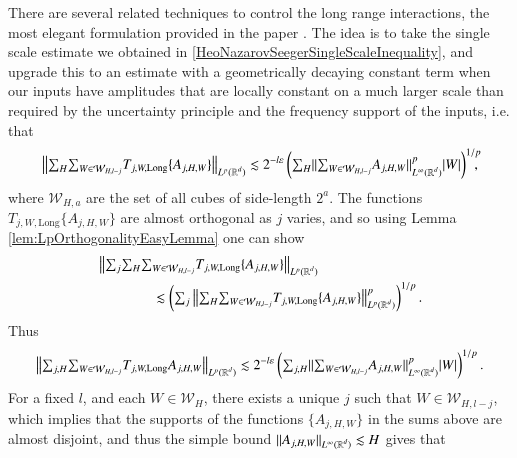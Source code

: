 There are several related techniques to control the long range interactions, the most elegant formulation provided in the paper \cite{HeoandNazarovandSeeger2}. The idea is to take the single scale estimate we obtained in \ref{HeoNazarovSeegerSingleScaleInequality}, and upgrade this to an estimate with a geometrically decaying constant term when our inputs have amplitudes that are locally constant on a much larger scale than required by the uncertainty principle and the frequency support of the inputs, i.e. that
%
\begin{equation}
  \left\| {\textstyle \sum\nolimits_H} {\textstyle \sum\nolimits_{W \in \mathcal{W}_{H,l-j}}} T_{j,W,\text{Long}} \{ A_{j,H,W} \} \right\|_{L^p(\operatorname{\mathbb{R}}^d)} \lesssim 2^{-l \varepsilon} \left( {\textstyle \sum\nolimits_H} \| {\textstyle \sum\nolimits_{W \in \mathcal{W}_{H,l-j}}} A_{j,H,W} \|_{L^\infty(\operatorname{\mathbb{R}}^d)}^p |W| \right)^{1/p}\!\!\!\!,
\end{equation}
%
where $\mathcal{W}_{H,a}$ are the set of all cubes of side-length $2^a$. The functions $T_{j,W,\text{Long}} \{ A_{j,H,W} \}$ are almost orthogonal as $j$ varies, and so using Lemma \ref{lem:LpOrthogonalityEasyLemma} one can show
\begin{equation}
\begin{split}
  &\left\| {\textstyle \sum\nolimits_j} {\textstyle \sum\nolimits_H} {\textstyle \sum\nolimits_{W \in \mathcal{W}_{H,l-j}}} T_{j,W,\text{Long}} \{ A_{j,H,W} \} \right\|_{L^p(\operatorname{\mathbb{R}}^d)}\\
  &\quad\quad\quad\quad \lesssim \left( {\textstyle \sum\nolimits_j} \left\| {\textstyle \sum\nolimits_H} {\textstyle \sum\nolimits_{W \in \mathcal{W}_{H,l-j}}} T_{j,W,\text{Long}} \{ A_{j,H,W} \} \right\|_{L^p(\operatorname{\mathbb{R}}^d)}^p \right)^{1/p}.
\end{split}
\end{equation}
%
Thus
%
\begin{equation}
  \left\| {\textstyle \sum\nolimits_{j,H}} {\textstyle \sum\nolimits_{W \in \mathcal{W}_{H,l-j}}} T_{j,W,\text{Long}} A_{j,H,W} \right\|_{L^p(\operatorname{\mathbb{R}}^d)} \lesssim 2^{-l \varepsilon} \left( {\textstyle \sum\nolimits_{j,H}} \|  {\textstyle \sum\nolimits_{W \in \mathcal{W}_{H,l-j}}} A_{j,H,W} \|_{L^\infty(\operatorname{\mathbb{R}}^d)}^p |W| \right)^{1/p}.
\end{equation}
%
For a fixed $l$, and each $W \in \mathcal{W}_H$, there exists a unique $j$ such that $W \in \mathcal{W}_{H,l-j}$, which implies that the supports of the functions $\{ A_{j,H,W} \}$ in the sums above are almost disjoint, and thus the simple bound $\| A_{j,H,W} \|_{L^\infty(\operatorname{\mathbb{R}}^d)} \lesssim H$ gives that

